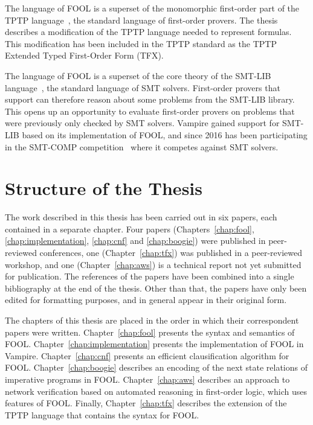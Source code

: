 The language of FOOL is a superset of the monomorphic first-order part of the TPTP language~\cite{tff0}, the standard language of first-order provers. The thesis describes a modification of the TPTP language needed to represent \folb{} formulas. This modification has been included in the TPTP standard as the TPTP Extended Typed First-Order Form (TFX).

The language of FOOL is a superset of the core theory of the SMT-LIB language~\cite{SMT-LIB}, the standard language of SMT solvers. First-order provers that support \folb{} can therefore reason about some problems from the SMT-LIB library. This opens up an opportunity to evaluate first-order provers on problems that were previously only checked by SMT solvers. Vampire gained support for SMT-LIB based on its implementation of FOOL, and since 2016 has been participating in the SMT-COMP competition~\cite{DBLP:conf/cav/BarrettMS05} where it competes against SMT solvers.

\section*{Structure of the Thesis}
\label{sect:intro:overview}

The work described in this thesis has been carried out in six papers, each contained in a separate chapter. Four papers (Chapters~\ref{chap:fool}, \ref{chap:implementation}, \ref{chap:cnf} and \ref{chap:boogie}) were published in peer-reviewed conferences, one (Chapter~\ref{chap:tfx}) was published in a peer-reviewed workshop, and one (Chapter~\ref{chap:aws}) is a technical report not yet submitted for publication. The references of the papers have been combined into a single bibliography at the end of the thesis. Other than that, the papers have only been edited for formatting purposes, and in general appear in their original form.

The chapters of this thesis are placed in the order in which their correspondent papers were written. Chapter~\ref{chap:fool} presents the syntax and semantics of FOOL. Chapter~\ref{chap:implementation} presents the implementation of FOOL in Vampire. Chapter~\ref{chap:cnf} presents an efficient clausification algorithm for FOOL. Chapter~\ref{chap:boogie} describes an encoding of the next state relations of imperative programs in FOOL. Chapter~\ref{chap:aws} describes an approach to network verification based on automated reasoning in first-order logic, which uses features of FOOL. Finally, Chapter~\ref{chap:tfx} describes the extension of the TPTP language that contains the syntax for FOOL.

